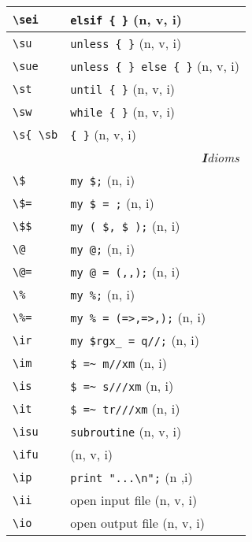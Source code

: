 \documentclass[oneside,10pt,landscape,DIV17]{scrartcl}
\begin{document}
\begin{multicols}{3}
\begin{center}
\begin{tabular}[]{|p{13mm}|p{56mm}|}
\hline \verb'\sei' & \verb'elsif { }'                  \hfill (n, v, i)\\
\hline \verb'\su'  & \verb'unless { }'                 \hfill (n, v, i)\\
\hline \verb'\sue' & \verb'unless { } else { }'        \hfill (n, v, i)\\
\hline \verb'\st'  & \verb'until { }'                  \hfill (n, v, i)\\
\hline \verb'\sw'  & \verb'while { }'                  \hfill (n, v, i)\\
\hline \verb'\s{ \sb'  & \verb'{ }'                        \hfill (n, v, i)\\
\hline
\hline
\multicolumn{2}{|r|}{\textsl{\textbf{I}dioms}}                 \\
\hline \verb'\$'   & \verb'my $;'              \hfill (n, i)   \\
\hline \verb'\$='  & \verb'my $ = ;'           \hfill (n, i)   \\
\hline \verb'\$$'  & \verb'my ( $, $ );'       \hfill (n, i)   \\
\hline \verb'\@'   & \verb'my @;'              \hfill (n, i)   \\
\hline \verb'\@='  & \verb'my @ = (,,);'       \hfill (n, i)   \\
\hline \verb'\%'   & \verb'my %;'              \hfill (n, i)   \\
\hline \verb'\%='  & \verb'my % = (=>,=>,);'   \hfill (n, i)   \\
\hline \verb'\ir'  & \verb'my $rgx_ = q//;'    \hfill (n, i)   \\
\hline \verb'\im'  & \verb'$ =~ m//xm'         \hfill (n, i)   \\
\hline \verb'\is'  & \verb'$ =~ s///xm'        \hfill (n, i)   \\
\hline \verb'\it'  & \verb'$ =~ tr///xm'       \hfill (n, i)   \\
\hline \verb'\isu' & \verb'subroutine'         \hfill (n, v, i)\\
       \verb'\ifu' &                           \hfill (n, v, i)\\
\hline \verb'\ip'  & \verb'print "...\n";'     \hfill (n ,i)   \\
\hline \verb'\ii'  & open input file           \hfill (n, v, i)\\
\hline \verb'\io'  & open output file          \hfill (n, v, i)\\

\end{tabular}
\end{center}
\end{multicols}
\end{document}
